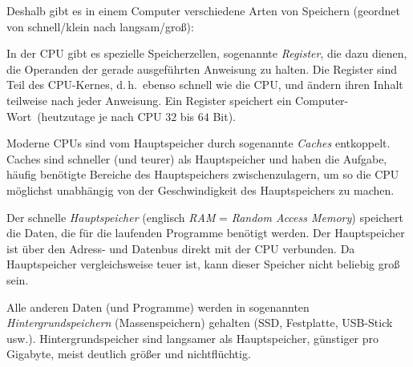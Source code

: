 \begin{minipage}{1.0\textwidth}
Deshalb gibt es in einem Computer verschiedene Arten von Speichern (geordnet
von schnell/klein nach langsam/groß):

\begin{compactitem}
\item In der CPU gibt es spezielle Speicherzellen, sogenannte \emph{Register},
die dazu dienen, die Operanden der gerade ausgeführten Anweisung zu halten. Die
Register sind Teil des CPU-Kernes, d.\,h.\ ebenso schnell wie die CPU, und ändern
ihren Inhalt teilweise nach jeder Anweisung. Ein Register speichert ein
Computer-\glqq Wort\grqq\ (heutzutage je nach CPU $32$ bis $64$ Bit).

\item Moderne CPUs sind vom Hauptspeicher durch sogenannte \emph{Caches}
entkoppelt. Caches sind schneller (und teurer) als Hauptspeicher und haben die
Aufgabe, häufig benötigte Bereiche des Hauptspeichers zwischenzulagern, um so
die CPU möglichst unabhängig von der Geschwindigkeit des Hauptspeichers zu
machen.

\item Der schnelle \emph{Hauptspeicher} (englisch \emph{RAM} = \emph{Random
Access Memory}) speichert die Daten, die für die laufenden Programme benötigt
werden. Der Hauptspeicher ist über den Adress- und Datenbus direkt mit der CPU
verbunden. Da Hauptspeicher vergleichsweise teuer ist, kann dieser Speicher
nicht beliebig groß sein.

\item Alle anderen Daten (und Programme) werden in sogenannten
\emph{Hintergrundspeichern} (Massenspeichern) gehalten (SSD, Festplatte,
USB-Stick usw.). Hintergrundspeicher sind langsamer als Hauptspeicher,
günstiger pro Gigabyte, meist deutlich größer und nichtflüchtig.
\end{compactitem}
\end{minipage}
